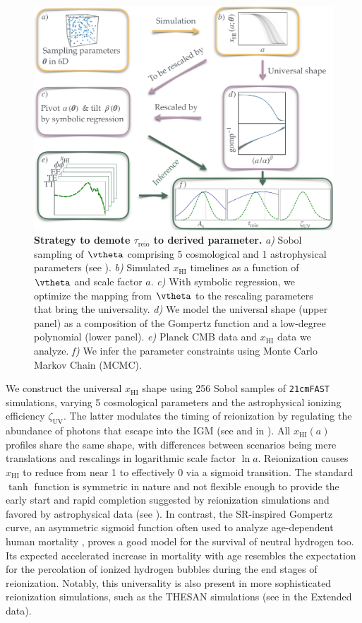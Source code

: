 \documentclass[12pt, a4paper]{article}
\newcommand{\zetaUV}{\zeta_\mathrm{UV}}
\newcommand{\HI}{\mathrm{HI}}
\newcommand{\reio}{\mathrm{reio}}
\begin{document}
\begin{figure}[tb]
\centering
\includegraphics[width=0.9\linewidth]{figs/big_fig.pdf}
\caption{\textbf{\boldmath Strategy to demote $\tau_\reio$ to derived
parameter.}
\emph{a)} Sobol sampling of $\vtheta$ comprising 5 cosmological and 1
astrophysical parameters (see ).
\emph{b)} Simulated $x_\HI$ timelines as a function of $\vtheta$ and
scale factor $a$.
\emph{c)} With symbolic regression, we optimize the mapping from
$\vtheta$ to the rescaling parameters that bring the universality.
\emph{d)} We model the universal shape (upper panel) as a composition of
the Gompertz function and a low-degree polynomial (lower panel).
\emph{e)} Planck CMB data and $x_\HI$ data we analyze.
\emph{f)} We infer the parameter constraints using Monte Carlo Markov
Chain (MCMC).}
\label{fig:big}
\end{figure}

We construct the universal $x_\HI$ shape using 256 Sobol samples
of \texttt{21cmFAST} simulations, varying 5 cosmological parameters
and the astrophysical ionizing efficiency $\zetaUV$.
The latter modulates the timing of reionization by regulating the
abundance of photons that escape into the IGM (see 
and  in ).
All $x_\HI(a)$ profiles share the same shape, with differences between
scenarios being mere translations and rescalings in logarithmic scale
factor $\ln a$.
Reionization causes $x_\HI$ to reduce from near 1 to effectively 0 via a
sigmoid transition.
The standard $\tanh$ function is symmetric in nature and not flexible
enough to provide the early start and rapid completion suggested by
reionization simulations \cite{Trac2018, Doussot2019} and favored by
astrophysical data (see ).
In contrast, the SR-inspired Gompertz curve, an asymmetric sigmoid
function often used to analyze age-dependent human mortality
\cite{Gompertz1825}, proves a good model for the survival of neutral
hydrogen too.
Its expected accelerated increase in mortality with age resembles the
expectation for the percolation of ionized hydrogen bubbles during the
end stages of reionization. Notably, this universality is also present 
in more sophisticated reionization simulations, such as the THESAN simulations
(see  in the Extended data).
\end{document}
